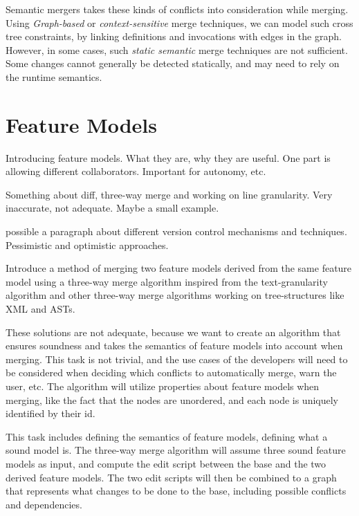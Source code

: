 \documentclass[a4paper,english]{ifimaster}
\begin{document}
Semantic mergers takes these kinds of conflicts into consideration while merging. Using \textit{Graph-based}  or \textit{context-sensitive} merge techniques, we can model such cross tree constraints, by linking definitions and invocations with edges in the graph. However, in some cases, such \textit{static semantic}  merge techniques are not sufficient. Some changes cannot generally be detected statically, and may need to rely on the runtime semantics.

\section{Feature Models}%
\label{sec:feature_models}

Introducing feature models. What they are, why they are useful. One part is allowing different collaborators. Important for autonomy, etc.

Something about diff, three-way merge and working on line granularity. Very inaccurate, not adequate. Maybe a small example.

possible a paragraph about different version control mechanisms and techniques. Pessimistic and optimistic approaches. \cite{cite:tom_mens_software_merging_survey}

Introduce a method of merging two feature models derived from the same feature model using a three-way merge algorithm inspired from the text-granularity algorithm and other three-way merge algorithms working on tree-structures like XML and ASTs.

These solutions are not adequate, because we want to create an algorithm that ensures soundness and takes the semantics of feature models into account when merging. This task is not trivial, and the use cases of the developers will need to be considered when deciding which conflicts to automatically merge, warn the user, etc. The algorithm will utilize properties about feature models when merging, like the fact that the nodes are unordered, and each node is uniquely identified by their id.

This task includes defining the semantics of feature models, defining what a sound model is. The three-way merge algorithm will assume three sound feature models as input, and compute the edit script between the base and the two derived feature models. The two edit scripts will then be combined to a graph that represents what changes to be done to the base, including possible conflicts and dependencies.

\end{document}
